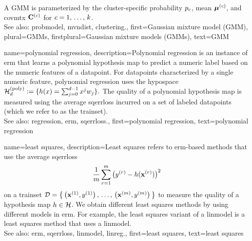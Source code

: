 {{				%
		A GMM is parameterized by the \gls{cluster}-specific \gls{probability}  
		$p_{c}$, \gls{mean} ${\bm \mu}^{(c)}$, and \gls{covmtx}  
		$\mathbf{C}^{(c)}$ for $c=1,\,\ldots,\,k$.
		\\		
		See also: \gls{probmodel}, \gls{mvndist}, \gls{clustering}.},
	first={Gaussian mixture model (GMM)},
	plural={GMMs}, 
	firstplural={Gaussian mixture models (GMMs)}, 
	text={GMM} 
}
	
{name={polynomial regression}, 
	description={Polynomial 
		\gls{regression} is an instance of \gls{erm} that learns a polynomial \gls{hypothesis} 
		\gls{map} to predict a numeric \gls{label} based on the numeric \glspl{feature} of a \gls{datapoint}. 
		 For \glspl{datapoint} characterized by a single numeric \gls{feature}, polynomial \gls{regression} uses the \gls{hypospace} 
		$\mathcal{H}^{(\rm poly)}_{d} := \{ h(x) = \sum_{j=0}^{d-1} x^{j} w_{j} \}.$
		The quality of a polynomial \gls{hypothesis} \gls{map} is measured using the average \gls{sqerrloss} 
		incurred on a set of \glspl{labeled datapoint} (which we refer to as the \gls{trainset}).
					\\
		See also: \gls{regression}, \gls{erm}, \gls{sqerrloss}.},
	first={polynomial regression},
	text={polynomial regression}
}

{name={least squares},
	description={Least squares refers to \gls{erm}-based 
        		methods that use the average \gls{sqerrloss} 
		$$ \frac{1}{m} \sum_{r=1}^{m} \big( y^{(r)} 
		- h({\bf x}^{(r)}) \big)^{2} $$   
		on a \gls{trainset} $\mathcal{D} = \big\{ \left( {\bf x}^{(1)},y^{(1)} \right), \,\ldots, \,
		\left( {\bf x}^{(m)},y^{(m)} \right) \big\}$	
		to measure the quality of a \gls{hypothesis} \gls{map} $h \in \mathcal{H}$. 
		We obtain different least squares methods by using different \glspl{model} 
		in \gls{erm}. For example, the least squares variant of a \gls{linmodel} 
		is a least squares method that uses a \gls{linmodel}.
			   \\
		See also: \gls{erm}, \gls{sqerrloss}, \gls{linmodel}, \gls{linreg}.},
	first={least squares},
	text={least squares}
}

